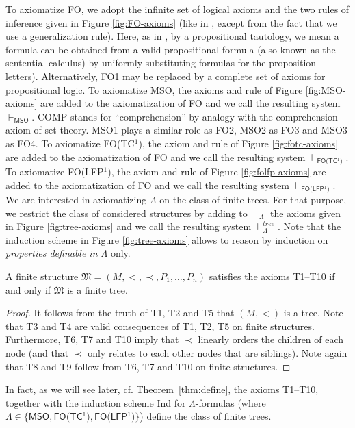 \documentclass{LMCS}
\newcommand{\fo}{\textsf{FO}\xspace}
\newcommand{\mso}{\textsf{MSO}\xspace}
\newcommand{\fotc}{\textsf{FO(TC$^1$)}\xspace}
\newcommand{\folfp}{\textsf{FO(LFP$^1$)}\xspace}
\begin{document}
To axiomatize \fo, we adopt the infinite set of
logical axioms and the two rules of inference given in Figure
\ref{fig:FO-axioms} (like in \cite{Enderton}, except from the fact
that we use a generalization rule). Here, as in \cite{Enderton}, by a 
propositional tautology, we mean a formula can be obtained
from a valid propositional formula (also known as the 
sentential calculus) by uniformly substituting formulas for the 
proposition letters). Alternatively, FO1 may be replaced by a 
complete set of axioms for propositional logic.
To axiomatize \mso, the
axioms and rule of Figure \ref{fig:MSO-axioms} are added to the
axiomatization of \fo and we call the resulting system $\vdash_\mso$.
COMP stands for ``comprehension'' by analogy with the
comprehension axiom of set theory. MSO1 plays a similar role as
FO2, MSO2 as FO3 and MSO3 as FO4. To axiomatize \fotc,
the axiom and rule of Figure \ref{fig:fotc-axioms} are added to
the axiomatization of \fo and we call the resulting system
$\vdash_\fotc$. To axiomatize \folfp, the axiom and rule of Figure
\ref{fig:folfp-axioms} are added to the axiomatization of \fo and we
call the resulting system $\vdash_\folfp$. We are interested in
axiomatizing $\Lambda$ on the class of finite trees. For that
purpose, we restrict the class of considered structures by adding
to $\vdash_\Lambda$ the axioms given in Figure
\ref{fig:tree-axioms} and we call the resulting system
$\vdash_\Lambda^{tree}$. Note that the induction scheme in Figure
\ref{fig:tree-axioms} allows to reason by induction on \emph{properties definable in $\Lambda$} only.

\begin{prop}\label{prop:define-finite}
A finite structure $\mathfrak{M}=(M,<,\prec,P_1, \ldots, P_n)$ satisfies the axioms T1--T10 if and only
if $\mathfrak{M}$ is a finite tree.
\end{prop}

\begin{proof}
  It follows from the truth of T1, T2 and T5 that $(M,<)$ is a tree.
  Note that T3 and T4 are valid consequences of T1, T2, T5 on finite
  structures.  Furthermore, T6, T7 and T10 imply that $\prec$
  linearly orders the children of each node (and that $\prec$ only
  relates to each other nodes that are siblings). Note again that
  T8 and T9 follow from T6, T7 and T10 on finite structures.
\end{proof}

In fact, as we will see later, cf. Theorem~\ref{thm:define}, the
axioms T1--T10, together with the induction scheme Ind for
$\Lambda$-formulas (where $\Lambda\in\{\mso, \fotc, \folfp\}$) define
the class of finite trees.
\end{document}
